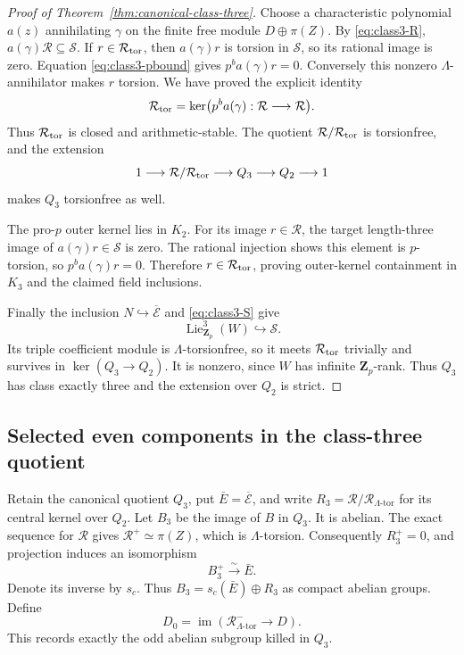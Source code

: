 \documentclass[11pt]{article}
\theoremstyle{definition}\newtheorem{definition}[theorem]{Definition}
\begin{document}
\begin{proof}[Proof of Theorem~\ref{thm:canonical-class-three}]
Choose a characteristic polynomial \(a(z)\) annihilating
\(\gamma\) on the finite free module \(D\oplus\pi(Z)\).
By \eqref{eq:class3-R}, \(a(\gamma)\mathcal R\subseteq \mathcal S\).
If \(r\in \mathcal R_{\rm tor}\), then \(a(\gamma)r\) is torsion
in \(\mathcal S\), so its rational image is zero. Equation
\eqref{eq:class3-pbound} gives \(p^ba(\gamma)r=0\).
Conversely this nonzero \(\Lambda\)-annihilator makes
\(r\) torsion. We have proved the explicit identity
\[
 \mathcal R_{\rm tor}
 =\ker\bigl(p^ba(\gamma):\mathcal R\longrightarrow \mathcal R\bigr).
\]
Thus \(\mathcal R_{\rm tor}\) is closed and arithmetic-stable.
The quotient \(\mathcal R/\mathcal R_{\rm tor}\) is torsionfree, and the
extension
\[
 1\longrightarrow \mathcal R/\mathcal R_{\rm tor}
 \longrightarrow Q_3\longrightarrow Q_2\longrightarrow1
\]
makes \(Q_3\) torsionfree as well.

The pro-$p$ outer kernel lies in \(K_2\).
For its image \(r\in \mathcal R\), the target length-three image
of \(a(\gamma)r\in \mathcal S\) is zero. The rational injection
shows this element is \(p\)-torsion, so
\(p^ba(\gamma)r=0\). Therefore \(r\in \mathcal R_{\rm tor}\), proving
outer-kernel containment in \(K_3\) and the claimed field
inclusions.

Finally the inclusion \(N\hookrightarrow\overline{\mathcal E}\) and
\eqref{eq:class3-S} give
\[
 \operatorname{Lie}^3_{\mathbf Z_p}(W)\hookrightarrow \mathcal S.
\]
Its triple coefficient module is \(\Lambda\)-torsionfree,
so it meets \(\mathcal R_{\rm tor}\) trivially and survives in
\(\ker(Q_3\to Q_2)\).
It is nonzero, since \(W\) has infinite \(\mathbf Z_p\)-rank.
Thus \(Q_3\) has class exactly three and the extension over
\(Q_2\) is strict.
\end{proof}


\subsection{Selected even components in the class-three quotient}
\label{subsec:selected-class-three}

Retain the canonical quotient $Q_3$, put $\bar E=\overline{\mathcal E}$, and write
$R_3=\mathcal R/\mathcal R_{\Lambda\text{-tor}}$ for its central
kernel over $Q_2$.  Let $B_3$ be the image of $B$ in $Q_3$.
It is abelian.  The exact sequence for $\mathcal R$ gives
$\mathcal R^+\simeq\pi(Z)$, which is $\Lambda$-torsion.
Consequently $R_3^+=0$, and projection induces an isomorphism
\[
 B_3^+\xrightarrow{\ \sim\ }\bar E.
\]
Denote its inverse by $s_c$.  Thus
$B_3=s_c(\bar E)\oplus R_3$ as compact abelian groups.
Define
\[
 D_0=\operatorname{im}
   (\mathcal R_{\Lambda\text{-tor}}^-\longrightarrow D).
\]
This records exactly the odd abelian subgroup killed in $Q_3$.
\end{document}
